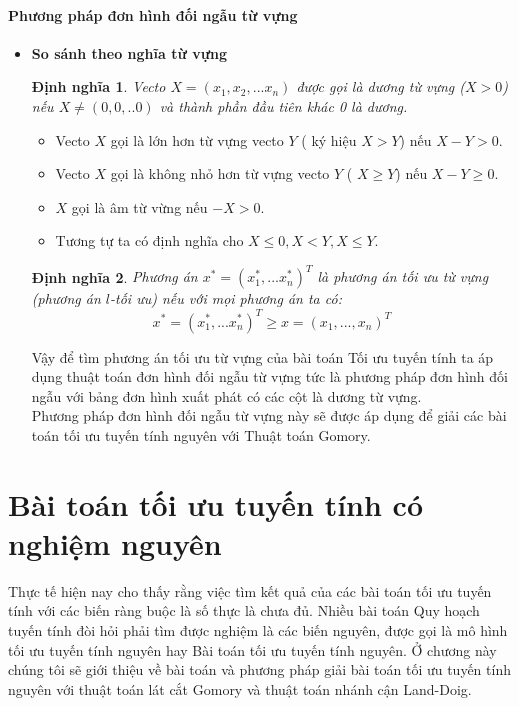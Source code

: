 \documentclass[12pt,a4paper]{report}
\newtheorem{dn}{Định nghĩa}
\begin{document}
\subsubsection{ Phương pháp đơn hình đối ngẫu từ vựng }
\begin{itemize}
    \item \textbf{So sánh theo nghĩa từ vựng}\\
    \begin{dn}
         Vecto $X=(x_1,x_2,...x_n)$ được gọi là dương từ vựng ($X >0$) nếu $X \ne (0,0,..0)$ và thành phần đầu tiên khác 0 là dương.\\ 
    \end{dn}
     \begin{itemize}
    \item Vecto $X$ gọi là lớn hơn từ vựng vecto $Y$ ( ký hiệu $X>Y$) nếu $X-Y>0$.\\ 
    \item Vecto $X$ gọi là không nhỏ hơn từ vựng vecto $Y$ ( $X\ge Y$) nếu $X-Y \ge 0$.\\
    \item $X$ gọi là âm từ vừng nếu $-X >0$.\\
    \item Tương tự ta có định nghĩa cho $X\le 0, X<Y, X\le Y$.\\
    
\end{itemize}
\begin{dn}
    Phương án $x^*=(x_1^*,...x_n^*)^T$ là phương án tối ưu từ vựng (phương án $l$-tối ưu) nếu với mọi phương án ta có:\\
    $$x^*=(x_1^*,...x_n^*)^T\ge x=(x_1,...,x_n)^T$$
\end{dn}
Vậy để tìm phương án tối ưu từ vựng của bài toán Tối ưu tuyến tính ta áp dụng thuật toán đơn hình đối ngẫu từ vựng tức là phương pháp đơn hình đối ngẫu với bảng đơn hình xuất phát có các cột là dương từ vựng.\\
Phương pháp đơn hình đối ngẫu từ vựng này sẽ được áp dụng để giải các bài toán tối ưu tuyến tính nguyên với Thuật toán Gomory.\\
\end{itemize}

\chapter{Bài toán tối ưu tuyến tính có nghiệm nguyên}
Thực tế hiện nay cho thấy rằng việc tìm kết quả của các bài toán tối ưu tuyến tính với các biến ràng buộc là số thực là chưa đủ. Nhiều bài toán Quy hoạch tuyến tính đòi hỏi phải tìm được nghiệm là các biến nguyên, được gọi là mô hình tối ưu tuyến tính nguyên hay Bài toán tối ưu tuyến tính nguyên. Ở chương này chúng tôi sẽ giới thiệu về bài toán và phương pháp giải bài toán tối ưu tuyến tính nguyên với  thuật toán lát cắt Gomory và thuật toán nhánh cận Land-Doig.
\end{document}
